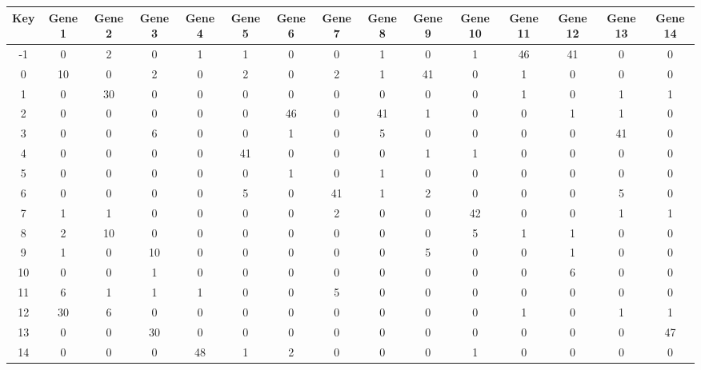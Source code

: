 \begin{tabular}{|c|c|c|c|c|c|c|c|c|c|c|c|c|c|c|}
\hline
Key & Gene 1 & Gene 2 & Gene 3 & Gene 4 & Gene 5 & Gene 6 & Gene 7 & Gene 8 & Gene 9 & Gene 10 & Gene 11 & Gene 12 & Gene 13 & Gene 14 \\
\hline
-1 & 0 & 2 & 0 & 1 & 1 & 0 & 0 & 1 & 0 & 1 & 46 & 41 & 0 & 0 \\
0 & 10 & 0 & 2 & 0 & 2 & 0 & 2 & 1 & 41 & 0 & 1 & 0 & 0 & 0 \\
1 & 0 & 30 & 0 & 0 & 0 & 0 & 0 & 0 & 0 & 0 & 1 & 0 & 1 & 1 \\
2 & 0 & 0 & 0 & 0 & 0 & 46 & 0 & 41 & 1 & 0 & 0 & 1 & 1 & 0 \\
3 & 0 & 0 & 6 & 0 & 0 & 1 & 0 & 5 & 0 & 0 & 0 & 0 & 41 & 0 \\
4 & 0 & 0 & 0 & 0 & 41 & 0 & 0 & 0 & 1 & 1 & 0 & 0 & 0 & 0 \\
5 & 0 & 0 & 0 & 0 & 0 & 1 & 0 & 1 & 0 & 0 & 0 & 0 & 0 & 0 \\
6 & 0 & 0 & 0 & 0 & 5 & 0 & 41 & 1 & 2 & 0 & 0 & 0 & 5 & 0 \\
7 & 1 & 1 & 0 & 0 & 0 & 0 & 2 & 0 & 0 & 42 & 0 & 0 & 1 & 1 \\
8 & 2 & 10 & 0 & 0 & 0 & 0 & 0 & 0 & 0 & 5 & 1 & 1 & 0 & 0 \\
9 & 1 & 0 & 10 & 0 & 0 & 0 & 0 & 0 & 5 & 0 & 0 & 1 & 0 & 0 \\
10 & 0 & 0 & 1 & 0 & 0 & 0 & 0 & 0 & 0 & 0 & 0 & 6 & 0 & 0 \\
11 & 6 & 1 & 1 & 1 & 0 & 0 & 5 & 0 & 0 & 0 & 0 & 0 & 0 & 0 \\
12 & 30 & 6 & 0 & 0 & 0 & 0 & 0 & 0 & 0 & 0 & 1 & 0 & 1 & 1 \\
13 & 0 & 0 & 30 & 0 & 0 & 0 & 0 & 0 & 0 & 0 & 0 & 0 & 0 & 47 \\
14 & 0 & 0 & 0 & 48 & 1 & 2 & 0 & 0 & 0 & 1 & 0 & 0 & 0 & 0 \\
\hline
\end{tabular}
